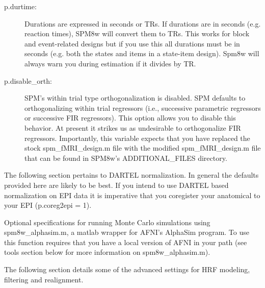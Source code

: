 \documentclass[12pt]{article}
\begin{document}
\begin{description}
\item[p.durtime:] Durations are expressed in seconds or TRs. If durations are in seconds (e.g. reaction times), SPM8w will convert them to TRs. This works for block and event-related designs but if you use this all durations must be in seconds (e.g. both the states and items in a state-item design). Spm8w will always warn you during estimation if it divides by TR.
\item[p.disable\_orth:] SPM's within trial type orthogonalization is disabled. SPM defaults to orthogonalizing within trial regressors (i.e., successive parametric regressors or successive FIR regressors). This option allows you to disable this behavior. At present it strikes us as undesirable to orthogonalize FIR regressors. Importantly, this variable expects that you have replaced the stock spm\_fMRI\_design.m file with the modified spm\_fMRI\_design.m file that can be found in SPM8w's ADDITIONAL\_FILES directory. 
\end{description}


The following section pertains to DARTEL normalization. In general the defaults provided here are likely to be best. If you intend to use DARTEL based normalization on EPI data it is imperative that you coregister your anatomical to your EPI (p.coreg2epi = 1). 


Optional specifications for running Monte Carlo simulations using spm8w\_alphasim.m, a matlab wrapper for AFNI’s AlphaSim program. To use this function requires that you have a local version of AFNI in your path (see tools section below for more information on spm8w\_alphasim.m).


The following section details some of the advanced settings for HRF modeling, filtering and realignment. 
\end{document}
